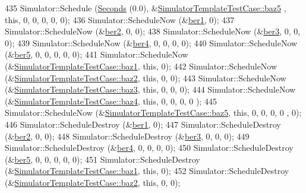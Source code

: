 \begin{DoxyCode}
435   Simulator::Schedule (\hyperlink{group__timecivil_ga33c34b816f8ff6628e33d5c8e9713b9e}{Seconds} (0.0), &\hyperlink{classSimulatorTemplateTestCase_a76b308d5067d417af9bd36710dc53251}{SimulatorTemplateTestCase::baz5}
      , \textcolor{keyword}{this}, 0, 0, 0, 0, 0);
436   Simulator::ScheduleNow (&\hyperlink{simulator-test-suite_8cc_ab7631fd281d604065e49de75d8702393}{ber1}, 0);
437   Simulator::ScheduleNow (&\hyperlink{simulator-test-suite_8cc_afd59b4263bbd81c9fb5fbd1a2f286d25}{ber2}, 0, 0);
438   Simulator::ScheduleNow (&\hyperlink{simulator-test-suite_8cc_a51a2766f65adfe161c85945d0a259574}{ber3}, 0, 0, 0);
439   Simulator::ScheduleNow (&\hyperlink{simulator-test-suite_8cc_a2ddd2b39f2ace879bf107f5be6c1959b}{ber4}, 0, 0, 0, 0);
440   Simulator::ScheduleNow (&\hyperlink{simulator-test-suite_8cc_a1b842995cae6f7fc1e071e478ee010ce}{ber5}, 0, 0, 0, 0, 0);
441   Simulator::ScheduleNow (&\hyperlink{classSimulatorTemplateTestCase_a1d732c063be0bf31734db30aca9bf826}{SimulatorTemplateTestCase::baz1}, \textcolor{keyword}{this}, 0);
442   Simulator::ScheduleNow (&\hyperlink{classSimulatorTemplateTestCase_acbbc7d0bab6bcc17f252bdfb47beb203}{SimulatorTemplateTestCase::baz2}, \textcolor{keyword}{this}, 0, 0);
443   Simulator::ScheduleNow (&\hyperlink{classSimulatorTemplateTestCase_aeb4509497390b255767735f3280ae6ee}{SimulatorTemplateTestCase::baz3}, \textcolor{keyword}{this}, 0, 0, 0);
444   Simulator::ScheduleNow (&\hyperlink{classSimulatorTemplateTestCase_a505c79bbe80197a1cf9f3f23f221f27d}{SimulatorTemplateTestCase::baz4}, \textcolor{keyword}{this}, 0, 0, 0, 0
      );
445   Simulator::ScheduleNow (&\hyperlink{classSimulatorTemplateTestCase_a76b308d5067d417af9bd36710dc53251}{SimulatorTemplateTestCase::baz5}, \textcolor{keyword}{this}, 0, 0, 0, 0
      , 0);
446   Simulator::ScheduleDestroy (&\hyperlink{simulator-test-suite_8cc_ab7631fd281d604065e49de75d8702393}{ber1}, 0);
447   Simulator::ScheduleDestroy (&\hyperlink{simulator-test-suite_8cc_afd59b4263bbd81c9fb5fbd1a2f286d25}{ber2}, 0, 0);
448   Simulator::ScheduleDestroy (&\hyperlink{simulator-test-suite_8cc_a51a2766f65adfe161c85945d0a259574}{ber3}, 0, 0, 0);
449   Simulator::ScheduleDestroy (&\hyperlink{simulator-test-suite_8cc_a2ddd2b39f2ace879bf107f5be6c1959b}{ber4}, 0, 0, 0, 0);
450   Simulator::ScheduleDestroy (&\hyperlink{simulator-test-suite_8cc_a1b842995cae6f7fc1e071e478ee010ce}{ber5}, 0, 0, 0, 0, 0);
451   Simulator::ScheduleDestroy (&\hyperlink{classSimulatorTemplateTestCase_a1d732c063be0bf31734db30aca9bf826}{SimulatorTemplateTestCase::baz1}, \textcolor{keyword}{this}, 0);
452   Simulator::ScheduleDestroy (&\hyperlink{classSimulatorTemplateTestCase_acbbc7d0bab6bcc17f252bdfb47beb203}{SimulatorTemplateTestCase::baz2}, \textcolor{keyword}{this}, 0, 0);

\end{DoxyCode}
